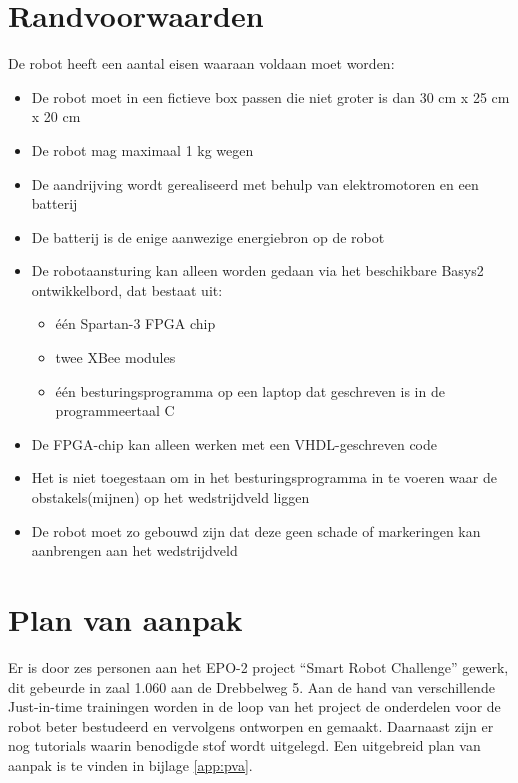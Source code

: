 \documentclass{report}
\begin{document}
\newpage
\section{Randvoorwaarden}

De robot heeft een aantal eisen waaraan voldaan moet worden:

\begin{itemize}

\item
De robot moet in een fictieve box passen die niet groter is dan 30 cm x 25 cm x 20 cm

\item
De robot mag maximaal 1 kg wegen

\item
De aandrijving wordt gerealiseerd met behulp van elektromotoren en een batterij

\item
De batterij is de enige aanwezige energiebron op de robot

\item
De robotaansturing kan alleen worden gedaan via het beschikbare Basys2 ontwikkelbord, dat bestaat uit:

\begin{itemize}

\item
één Spartan-3 FPGA chip

\item
twee XBee modules

\item
één besturingsprogramma op een laptop dat geschreven is in de programmeertaal C


\end{itemize}

\item
De FPGA-chip kan alleen werken met een VHDL-geschreven code

\item
Het is niet toegestaan om in het besturingsprogramma in te voeren waar de obstakels(mijnen) op het wedstrijdveld liggen 

\item
De robot moet zo gebouwd zijn dat deze geen schade of markeringen kan aanbrengen aan het wedstrijdveld

\end{itemize}

\section{Plan van aanpak}

Er is door zes personen aan het EPO-2 project ``Smart Robot Challenge'' gewerk, dit gebeurde in zaal 1.060 aan de Drebbelweg 5.
Aan de hand van verschillende Just-in-time trainingen worden in de loop van het project de onderdelen voor de robot beter bestudeerd en vervolgens ontworpen en gemaakt.
Daarnaast zijn er nog tutorials waarin benodigde stof wordt uitgelegd.
Een uitgebreid plan van aanpak is te vinden in bijlage \ref{app:pva}.
\end{document}
